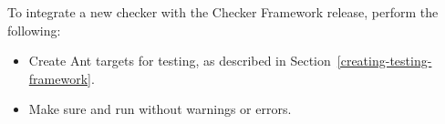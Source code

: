 
To integrate a new checker with the Checker Framework release, perform
the following:

\begin{itemize}

\item Create Ant targets for testing, as described in
  Section~\ref{creating-testing-framework}.

\item Make sure  and  run
without warnings or errors.

\end{itemize}


